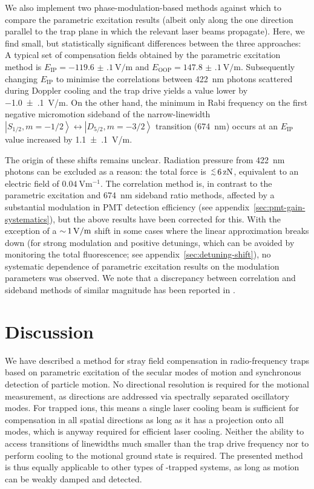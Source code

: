 \documentclass[pra,twocolumn]{revtex4-2}
\begin{document}
We also implement two phase-modulation-based methods against which to compare the parametric excitation results (albeit only along the one direction parallel to the trap plane in which the relevant laser beams propagate).
Here, we find small, but statistically significant differences between the three approaches:
A typical set of compensation fields obtained by the parametric excitation method is $E_{\mathrm{IP}} = \SI{-119.6(1)}{\volt / \metre}$ and $E_{\mathrm{OOP}} = \SI{147.8(1)}{\volt / \metre}$.
Subsequently changing $E_{\mathrm{IP}}$ to minimise the correlations between \SI{422}{\nano\metre} photons scattered during Doppler cooling and the trap \RF{} drive yields a value lower by \SI{-1.0(1)}{\volt / \metre}.
On the other hand, the minimum in Rabi frequency on the first negative micromotion sideband of the narrow-linewidth $\left|{S}_{1/2}, m=-1/2 \right\rangle \leftrightarrow \left|{D}_{5/2}, m=-3/2 \right\rangle$ transition (\SI{674}{\nano\metre}) occurs at an $E_{\mathrm{IP}}$ value increased by \SI{1.1(1)}{\volt / \metre}.

The origin of these shifts remains unclear.
Radiation pressure from \SI{422}{\nano\metre} photons can be excluded as a reason: the total force is $\ltish \SI{6}{\zepto\newton}$, equivalent to an electric field of $\SI{0.04}{\volt \metre^{-1}}$.
The \RF{} correlation method is, in contrast to the parametric excitation and \SI{674}{\nano\metre} sideband ratio methods, affected by a substantial modulation in PMT detection efficiency (see appendix~\ref{sec:pmt-gain-systematics}), but the above results have been corrected for this.
With the exception of a $\mbox{$\sim$}\, \SI{1}{\volt / \metre}$ shift in some cases where the linear approximation breaks down (for strong modulation and positive detunings, which can be avoided by monitoring the total fluorescence; see appendix~\ref{sec:detuning-shift}), no systematic dependence of parametric excitation results on the modulation parameters was observed.
We note that a discrepancy between \RF{} correlation and sideband methods of similar magnitude has been reported in .

\section{Discussion}

We have described a method for stray field compensation in radio-frequency traps based on parametric excitation of the secular modes of motion and synchronous detection of particle motion.
No directional resolution is required for the motional measurement, as directions are addressed via spectrally separated oscillatory modes.
For trapped ions, this means a single laser cooling beam is sufficient for compensation in all spatial directions as long as it has a projection onto all modes, which is anyway required for efficient laser cooling.
Neither the ability to access transitions of linewidths much smaller than the trap drive frequency nor to perform cooling to the motional ground state is required.
The presented method is thus equally applicable to other types of \RF{}-trapped systems, as long as motion can be weakly damped and detected.
\end{document}
